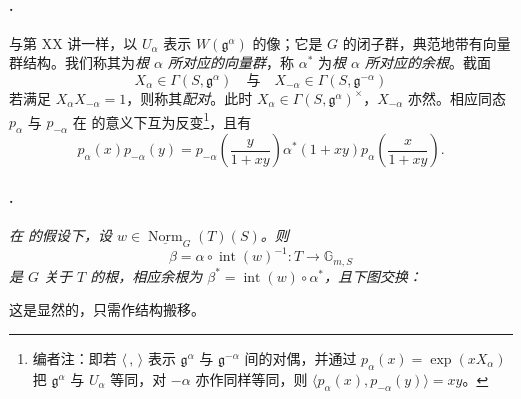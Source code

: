 \paragraph{.}
与第 XX 讲一样，以 \(U_\alpha\) 表示 \(W(\mathfrak g^\alpha)\) 的像；它是 \(G\) 的闭子群，典范地带有向量群结构。我们称其为\emph{根 \(\alpha\) 所对应的向量群}，称 \(\alpha^*\) 为\emph{根 \(\alpha\) 所对应的余根}。截面
\[
  X_\alpha\in\Gamma(S,\mathfrak g^\alpha)
  \quad\text{与}\quad
  X_{-\alpha}\in\Gamma(S,\mathfrak g^{-\alpha})
\]
若满足 \(X_\alpha X_{-\alpha}=1\)，则称其\emph{配对}。此时
\(X_\alpha\in\Gamma(S,\mathfrak g^\alpha)^\times\)，\(X_{-\alpha}\) 亦然。相应同态 \(p_\alpha\) 与 \(p_{-\alpha}\) 在 的意义下互为反变\footnote{编者注：即若 \(\langle\, ,\,\rangle\) 表示 \(\mathfrak g^\alpha\) 与 \(\mathfrak g^{-\alpha}\) 间的对偶，并通过 \(p_\alpha(x)=\exp(xX_\alpha)\) 把 \(\mathfrak g^\alpha\) 与 \(U_\alpha\) 等同，对 \(-\alpha\) 亦作同样等同，则
\(\langle p_\alpha(x),p_{-\alpha}(y)\rangle=xy\)。}，且有
\[
  p_\alpha(x)p_{-\alpha}(y)
  =
  p_{-\alpha}\left(\frac{y}{1+xy}\right)
  \alpha^*(1+xy)
  p_\alpha\left(\frac{x}{1+xy}\right).
\]

\paragraph{.}
\textit{在  的假设下，设
\(w\in\underline{\operatorname{Norm}}_G(T)(S)\)。则}
\[
  \beta=\alpha\circ\operatorname{int}(w)^{-1}
  :T\longrightarrow\mathbb G_{m,S}
\]
\textit{是 \(G\) 关于 \(T\) 的根，相应余根为
\(\beta^*=\operatorname{int}(w)\circ\alpha^*\)，且下图交换：}
\begin{center}
\end{center}

这是显然的，只需作结构搬移。

